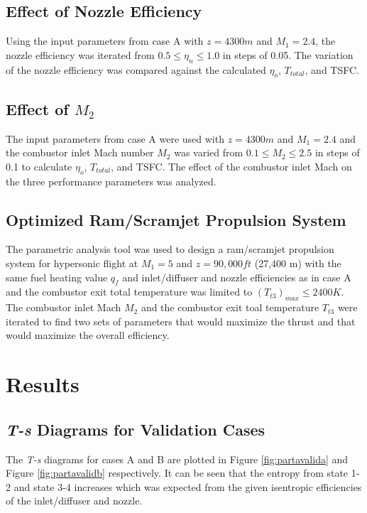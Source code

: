 \documentclass[conf]{new-aiaa} %
\begin{document}
\subsection{Effect of Nozzle Efficiency} %
Using the input parameters from case A with $z=4300m$ and $M_1=2.4$, the nozzle efficiency was iterated from $0.5\leq\eta_n\leq1.0$ in steps of 0.05. The variation of the nozzle efficiency was compared against the calculated $\eta_o$, $T_{total}$, and TSFC.

\subsection{Effect of \texorpdfstring{\textit{$M_2$}}{M2}} %
The input parameters from case A were used with $z=4300m$ and $M_1=2.4$ and the combustor inlet Mach number $M_2$ was varied from $0.1\leq M_2\leq2.5$ in steps of 0.1 to calculate $\eta_o$, $T_{total}$, and TSFC. The effect of the combustor inlet Mach on the three performance parameters was analyzed.

\subsection{Optimized Ram/Scramjet Propulsion System} %
The parametric analysis tool was used to design a ram/scramjet propulsion system for hypersonic flight at $M_1=5$ and $z=90,000ft$ (27,400 m) with the same fuel heating value $q_f$ and inlet/diffuser and nozzle efficiencies as in case A and the combustor exit total temperature was limited to $\left(T_{t3}\right)_{max}\leq2400K$. The combustor inlet Mach $M_2$ and the combustor exit toal temperature $T_{t3}$ were iterated to find two sets of parameters that would maximize the thrust and that would maximize the overall efficiency.


\section{Results} \label{sec:results}
\subsection{\textit{T-s} Diagrams for Validation Cases} %
The \textit{T-s} diagrams for cases A and B are plotted in Figure \ref{fig:partavalida} and Figure \ref{fig:partavalidb} respectively. It can be seen that the entropy from state 1-2 and state 3-4 increases which was expected from the given isentropic efficiencies of the inlet/diffuser and nozzle.
\end{document}
